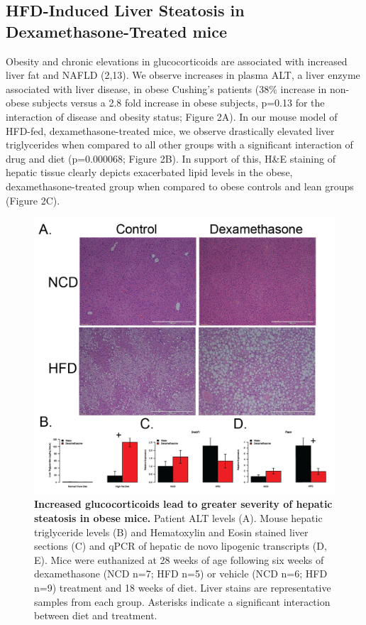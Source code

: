 \documentclass[11pt]{article} %
\begin{document}
\subsection*{HFD-Induced Liver Steatosis in Dexamethasone-Treated
mice}\label{hfd-induced-liver-steatosis-in-dexamethasone-treated-mice}

Obesity and chronic elevations in glucocorticoids are associated with
increased liver fat and NAFLD (2,13). We observe increases in plasma
ALT, a liver enzyme associated with liver disease, in obese Cushing's
patients (38\% increase in non-obese subjects versus a 2.8 fold increase
in obese subjects, p=0.13 for the interaction of disease and obesity
status; Figure 2A). In our mouse model of HFD-fed, dexamethasone-treated
mice, we observe drastically elevated liver triglycerides when compared
to all other groups with a significant interaction of drug and diet
(p=0.000068; Figure 2B). In support of this, H\&E staining of hepatic
tissue clearly depicts exacerbated lipid levels in the obese,
dexamethasone-treated group when compared to obese controls and lean
groups (Figure 2C).

\begin{figure}
  \begin{center}
    \includegraphics[width=\textwidth]{Figures_Figure_2.png}
  \end{center}
  \caption{\textbf{Increased glucocorticoids lead to greater severity of hepatic steatosis in obese mice.}
Patient ALT levels (A). Mouse hepatic triglyceride levels (B) and Hematoxylin and Eosin stained liver sections (C) and qPCR of hepatic de novo lipogenic transcripts (D, E). Mice were euthanized at 28 weeks of age following six weeks of dexamethasone (NCD n=7; HFD n=5) or vehicle (NCD n=6; HFD n=9) treatment and 18 weeks of diet. Liver stains are representative samples from each group. Asterisks indicate a significant interaction between diet and treatment.}
 \label{fig:2}
\end{figure}
\end{document}
